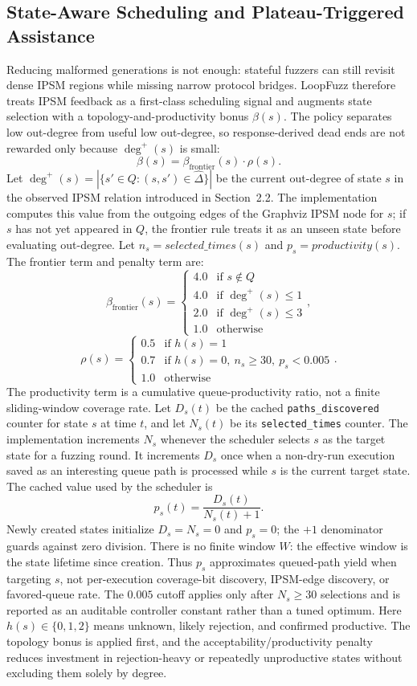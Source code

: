\documentclass[final,5p,times,number]{elsarticle}
\begin{document}
\subsection{State-Aware Scheduling and Plateau-Triggered Assistance}
Reducing malformed generations is not enough: stateful fuzzers can still revisit dense IPSM regions while missing narrow protocol bridges. LoopFuzz therefore treats IPSM feedback as a first-class scheduling signal and augments state selection with a topology-and-productivity bonus $\beta(s)$. The policy separates low out-degree from useful low out-degree, so response-derived dead ends are not rewarded only because $\deg^+(s)$ is small:
\[
\beta(s)=\beta_{\mathrm{frontier}}(s)\cdot \rho(s).
\]
Let $\deg^+(s)=|\{s'\in Q:(s,s')\in\widehat{\Delta}\}|$ be the current out-degree of state $s$ in the observed IPSM relation introduced in Section~2.2. The implementation computes this value from the outgoing edges of the Graphviz IPSM node for $s$; if $s$ has not yet appeared in $Q$, the frontier rule treats it as an unseen state before evaluating out-degree. Let $n_s=\mathit{selected\_times}(s)$ and $p_s=\mathit{productivity}(s)$. The frontier term and penalty term are:
\[
\beta_{\mathrm{frontier}}(s) = \begin{cases}
4.0 & \text{if } s \notin Q \\
4.0 & \text{if } \deg^+(s) \le 1 \\
2.0 & \text{if } \deg^+(s) \le 3 \\
1.0 & \text{otherwise}
\end{cases},
\]
\[
\rho(s) = \begin{cases}
0.5 & \text{if } h(s)=1 \\
0.7 & \text{if } h(s)=0,\ n_s\ge30,\ p_s<0.005 \\
1.0 & \text{otherwise}
\end{cases}.
\]
The productivity term is a cumulative queue-productivity ratio, not a finite sliding-window coverage rate. Let $D_s(t)$ be the cached \texttt{paths\_discovered} counter for state $s$ at time $t$, and let $N_s(t)$ be its \texttt{selected\_times} counter. The implementation increments $N_s$ whenever the scheduler selects $s$ as the target state for a fuzzing round. It increments $D_s$ once when a non-dry-run execution saved as an interesting queue path is processed while $s$ is the current target state. The cached value used by the scheduler is
\[
p_s(t)=\frac{D_s(t)}{N_s(t)+1}.
\]
Newly created states initialize $D_s=N_s=0$ and $p_s=0$; the $+1$ denominator guards against zero division. There is no finite window $W$: the effective window is the state lifetime since creation. Thus $p_s$ approximates queued-path yield when targeting $s$, not per-execution coverage-bit discovery, IPSM-edge discovery, or favored-queue rate. The $0.005$ cutoff applies only after $N_s\ge30$ selections and is reported as an auditable controller constant rather than a tuned optimum. Here $h(s)\in\{0,1,2\}$ means unknown, likely rejection, and confirmed productive. The topology bonus is applied first, and the acceptability/productivity penalty reduces investment in rejection-heavy or repeatedly unproductive states without excluding them solely by degree.
\end{document}
